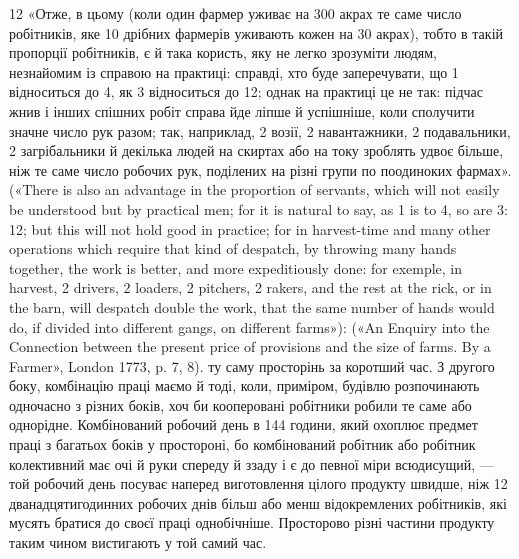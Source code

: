 12 «Отже, в цьому (коли один фармер уживає на 300 акрах те саме
число робітників, яке 10 дрібних фармерів уживають кожен на 30 акрах),
тобто в такій пропорції робітників, є й така користь, яку не легко зрозуміти
людям, незнайомим із справою на практиці: справді, хто буде
заперечувати, що 1 відноситься до 4, як 3 відноситься до 12; однак на
практиці це не так: підчас жнив і інших спішних робіт справа йде ліпше
й успішніше, коли сполучити значне число рук разом; так, наприклад,
2 возії, 2 навантажники, 2 подавальники, 2 загрібальники й декілька
людей на скиртах або на току зроблять удвоє більше, ніж те саме число
робочих рук, поділених на різні групи по поодиноких фармах». («There
is also an advantage in the proportion of servants, which will not easily be
understood but by practical men; for it is natural to say, as 1 is to 4, so
are 3: 12; but this will not hold good in practice; for in harvest-time
and many other operations which require that kind of despatch, by throwing
many hands together, the work is better, and more expeditiously done:
for exemple, in harvest, 2 drivers, 2 loaders, 2 pitchers, 2 rakers, and the
rest at the rick, or in the barn, will despatch double the work, that the same
number of hands would do, if divided into different gangs, on different
farms»): («An Enquiry into the Connection between the present price of
provisions and the size of farms. By a Farmer», London 1773, p. 7, 8).
ту саму просторінь за коротший час. З другого боку, комбінацію
праці маємо й тоді, коли, приміром, будівлю розпочинають одночасно
з різних боків, хоч би кооперовані робітники робили те
саме або однорідне. Комбінований робочий день в 144 години,
який охоплює предмет праці з багатьох боків у простороні, бо
комбінований робітник або робітник колективний має очі й руки
спереду й ззаду і є до певної міри всюдисущий, — той робочий
день посуває наперед виготовлення цілого продукту швидше,
ніж 12 дванадцятигодинних робочих днів більш або менш відокремлених
робітників, які мусять братися до своєї праці однобічніше.
Просторово різні частини продукту таким чином вистигають
у той самий час.

